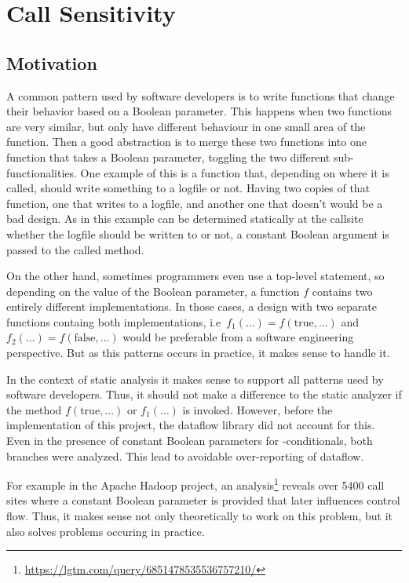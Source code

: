\section{Call Sensitivity}
\label{sec:call-sens}
\subsection{Motivation}
A common pattern used by software developers is to 
write functions that change their behavior based on 
a Boolean parameter.
This happens when two functions are very similar, but only have different behaviour
in one small area of the function.
Then a good abstraction is to merge these two functions into one function that takes 
a Boolean parameter, toggling the two different sub-functionalities.
One example of this is a function that, depending on where it is called,
should write something to a logfile or not.
Having two copies of that function, one that writes to a logfile, and another one 
that doesn't would be a bad design.
As in this example can be determined statically at the callsite whether the logfile
should be written to or not, a constant Boolean argument is passed to the called method.

On the other hand, sometimes programmers even use a top-level
 statement, so depending on the
value of the Boolean parameter, a function $f$ contains two entirely different implementations.
In those cases, a design with two separate functions containg both implementations,
i.e\ $f_1(\ldots) = f(\text{true}, \ldots)$ and $f_2(\ldots) = f(\text{false}, \ldots)$
would be preferable from a software engineering perspective. But as this patterns
occurs in practice, it makes sense to handle it.

In the context of static analysis it makes sense to support all patterns
used by software developers.
Thus, it should not make a difference to the static analyzer
if the method $f(\text{true}, \ldots)$ or $f_1(\ldots)$ is invoked.
However, before the implementation of this project, the dataflow library did not 
account for this.
Even in the presence of constant Boolean parameters for -conditionals,
both branches were analyzed.
This lead to avoidable over-reporting of dataflow.

For example in the Apache Hadoop project, an analysis\footnote{\url{https://lgtm.com/query/6851478535536757210/}}
reveals over 5400 call sites 
where a constant Boolean parameter is provided that later influences control flow.
Thus, it makes sense not only theoretically to work on this problem, but it also 
solves problems occuring in practice.

